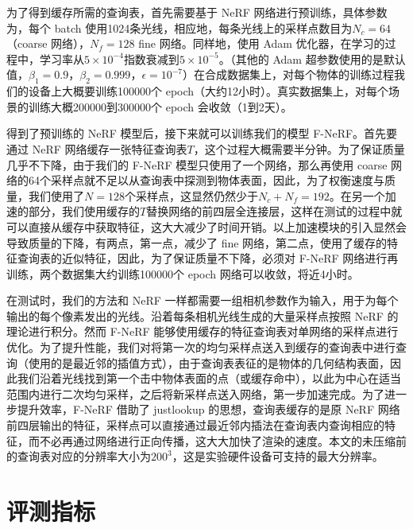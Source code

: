 为了得到缓存所需的查询表，首先需要基于 NeRF 网络进行预训练，具体参数为，每个 batch 使用1024条光线，相应地，每条光线上的采样点数目为$N_c = 64$（coarse 网络），$N_f = 128$ fine 网络。同样地，使用 Adam 优化器\cite{kingma2014adam}，在学习的过程中，学习率从$5 \times 10^{-4}$指数衰减到$5 \times 10^{-5}$。（其他的 Adam 超参数使用的是默认值，$\beta_{1} = 0.9$，$\beta_{2} = 0.999$，$\epsilon = 10^{-7}$）在合成数据集上，对每个物体的训练过程我们的设备上大概要训练100000个 epoch（大约12小时）。真实数据集上，对每个场景的训练大概200000到300000个 epoch 会收敛（1到2天）。

得到了预训练的 NeRF 模型后，接下来就可以训练我们的模型 F-NeRF。首先要通过 NeRF 网络缓存一张特征查询表$T$，这个过程大概需要半分钟。为了保证质量几乎不下降，由于我们的 F-NeRF 模型只使用了一个网络，那么再使用 coarse 网络的64个采样点就不足以从查询表中探测到物体表面，因此，为了权衡速度与质量，我们使用了$N = 128$个采样点，这显然仍然少于$N_c + N_f = 192$。在另一个加速的部分，我们使用缓存的$T$替换网络的前四层全连接层，这样在测试的过程中就可以直接从缓存中获取特征，这大大减少了时间开销。以上加速模块的引入显然会导致质量的下降，有两点，第一点，减少了 fine 网络，第二点，使用了缓存的特征查询表的近似特征，因此，为了保证质量不下降，必须对 F-NeRF 网络进行再训练，两个数据集大约训练100000个 epoch 网络可以收敛，将近4小时。

在测试时，我们的方法和 NeRF 一样都需要一组相机参数作为输入，用于为每个输出的每个像素发出的光线。沿着每条相机光线生成的大量采样点按照 NeRF 的理论进行积分。然而 F-NeRF 能够使用缓存的特征查询表对单网络的采样点进行优化。为了提升性能，我们对将第一次的均匀采样点送入到缓存的查询表中进行查询（使用的是最近邻的插值方式），由于查询表表征的是物体的几何结构表面，因此我们沿着光线找到第一个击中物体表面的点（或缓存命中），以此为中心在适当范围内进行二次均匀采样，之后将新采样点送入网络，第一步加速完成。为了进一步提升效率，F-NeRF 借助了 justlookup \cite{lin2019justlookup}的思想，查询表缓存的是原 NeRF 网络前四层输出的特征，采样点可以直接通过最近邻内插法在查询表内查询相应的特征，而不必再通过网络进行正向传播，这大大加快了渲染的速度。本文的未压缩前的查询表对应的分辨率大小为$200^3$，这是实验硬件设备可支持的最大分辨率。

\section{评测指标}\label{metrics}
